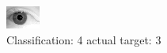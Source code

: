\begin{figure}[h!]
\begin{center}
\includegraphics[width=0.60\columnwidth]{figures/ID2102_class_4_target_3.png}
\end{center}
\caption{ Classification: 4 actual target: 3}
\label{fig:ID2102_class_4_target_3}
\end{figure}
